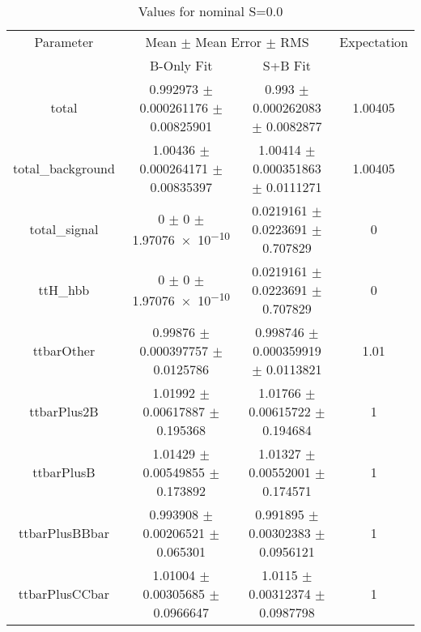 \begin{table}
\centering
\caption{Values for nominal S=0.0}
\begin{tabular}{cccc}
\toprule
Parameter & \multicolumn{2}{c}{Mean $\pm$ Mean Error $\pm$ RMS} & Expectation\\
 & B-Only Fit & S+B Fit & \\
\midrule
total & \num{0.992973} $\pm$ \num{0.000261176} $\pm$ \num{0.00825901} & \num{0.993} $\pm$ \num{0.000262083} $\pm$ \num{0.0082877} & \num{1.00405}\\
total\_background & \num{1.00436} $\pm$ \num{0.000264171} $\pm$ \num{0.00835397} & \num{1.00414} $\pm$ \num{0.000351863} $\pm$ \num{0.0111271} & \num{1.00405}\\
total\_signal & \num{0} $\pm$ \num{0} $\pm$ \num{1.97076e-10} & \num{0.0219161} $\pm$ \num{0.0223691} $\pm$ \num{0.707829} & \num{0}\\
ttH\_hbb & \num{0} $\pm$ \num{0} $\pm$ \num{1.97076e-10} & \num{0.0219161} $\pm$ \num{0.0223691} $\pm$ \num{0.707829} & \num{0}\\
ttbarOther & \num{0.99876} $\pm$ \num{0.000397757} $\pm$ \num{0.0125786} & \num{0.998746} $\pm$ \num{0.000359919} $\pm$ \num{0.0113821} & \num{1.01}\\
ttbarPlus2B & \num{1.01992} $\pm$ \num{0.00617887} $\pm$ \num{0.195368} & \num{1.01766} $\pm$ \num{0.00615722} $\pm$ \num{0.194684} & \num{1}\\
ttbarPlusB & \num{1.01429} $\pm$ \num{0.00549855} $\pm$ \num{0.173892} & \num{1.01327} $\pm$ \num{0.00552001} $\pm$ \num{0.174571} & \num{1}\\
ttbarPlusBBbar & \num{0.993908} $\pm$ \num{0.00206521} $\pm$ \num{0.065301} & \num{0.991895} $\pm$ \num{0.00302383} $\pm$ \num{0.0956121} & \num{1}\\
ttbarPlusCCbar & \num{1.01004} $\pm$ \num{0.00305685} $\pm$ \num{0.0966647} & \num{1.0115} $\pm$ \num{0.00312374} $\pm$ \num{0.0987798} & \num{1}\\
\bottomrule
\end{tabular}
\end{table}